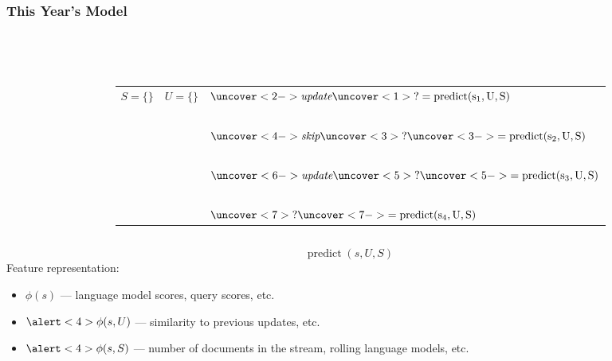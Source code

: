 \documentclass{beamer}
\begin{document}
\begin{frame}
    \frametitle{This Year's Model}
\begin{columns}[T] %
\begin{column}{.10\textwidth}
    ~\\~\\
    \def\svgwidth{\columnwidth}
    \only<1>{
        \resizebox{.35\textwidth}{!}{}
    }
\end{column}%
\hfill%
\begin{column}{.86\textwidth}
    ~\\
    ~\\
    \begin{tabular}{L{2.6cm} L{2.1cm} R{4.6cm}}
        $S=\{\}$ &    
        $U = \{\}$ & $ \uncover<2->{\textit{update}}\uncover<1>{?} = \operatorname{predict(s_1, U, S)}$\\
        ~\\
         &   
         & $ \uncover<4->{\textit{skip}}\uncover<3>{?}\uncover<3->{ = \operatorname{predict(s_2, U, S)}}$\\
        ~\\
         &  
         & 
        $ \uncover<6->{\textit{update}}\uncover<5>{?}\uncover<5->{ =  \operatorname{predict(s_3, U, S)}}$\\
        ~\\
         &  
         & $ 
        \uncover<7>{?} \uncover<7->{=  \operatorname{predict(s_4, U, S)}}$\\
    \end{tabular}
\end{column}%
\end{columns}

\end{frame}

\begin{frame}
     \[\operatorname{predict}(s, U, S)\]
        Feature representation:
        \begin{itemize}
            \item $\phi(s)$ --- language model scores, query scores, etc.
            \item<2-> $\alert<4>{\phi(s, U)}$ --- similarity to previous updates, etc.
            \item<3-> $\alert<4>{\phi(s, S)}$ --- number of documents in the stream, rolling 
                language models, etc.
        \end{itemize}
\end{frame}
\end{document}
